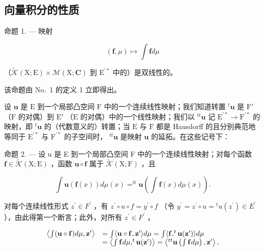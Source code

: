 \subsection{向量积分的性质}

命题 1. --- 映射

\[
(\mathbf {f}, \mu) \mapsto \int \mathbf {f} d \mu
\]

（\(\widetilde{\mathcal{K}} (\mathrm{X};\mathrm{E})\times \mathcal{M}(\mathrm{X};\mathbf{C})\) 到 \(\mathrm{E}^{\prime *}\) 中的）是双线性的。

该命题由 No.~1 的定义 1 立即得出。

设 \(\mathbf{u}\) 是 \(\mathrm{E}\) 到一个局部凸空间 \(\mathrm{F}\) 中的一个连续线性映射；我们知道转置 \(^t\mathbf{u}\) 是 \(\mathrm{F}'\) （\(\mathrm{F}\) 的对偶）到 \(\mathrm{E}'\) （\(\mathrm{E}\) 的对偶）中的一个线性映射；我们以 \(^{tt}\mathbf{u}\) 记 \(\mathrm{E}^{\prime *} \to \mathrm{F}^{\prime *}\) 的映射，即 \(^t\mathbf{u}\) 的（代数意义的）转置；当 \(\mathrm{E}\) 与 \(\mathrm{F}\) 都是 Hausdorff 的且分别典范地等同于 \(\mathrm{E}^{\prime *}\) 与 \(\mathrm{F}^{\prime *}\) 的子空间时， \(^{tt}\mathbf{u}\) 是映射 \(\mathbf{u}\) 的延拓。在这些记号下：

命题 2. --- 设 u 是 E 到一个局部凸空间 F 中的一个连续线性映射；对每个函数 \(\mathbf{f} \in \widetilde{\mathcal{K}}(\mathrm{X};\mathrm{E})\) ，函数 \(\mathbf{u} \circ \mathbf{f}\) 属于 \(\widetilde{\mathcal{K}}(\mathrm{X};\mathrm{F})\) ，且

\[
\int \mathbf {u} (\mathbf {f} (x)) d \mu (x) = ^ {t t} \mathbf {u} \left(\int \mathbf {f} (x) d \mu (x)\right).\tag{2}
\]

对每个连续线性形式 \(z^{\prime} \in F^{\prime}\) ，有 \(z^{\prime} \circ u \circ f = y^{\prime} \circ f\) （令 \(y^{\prime} = z^{\prime} \circ u = {}^{t}u(z^{\prime}) \in E^{\prime}\) ），由此得第一个断言；此外，对所有 \(z^{\prime} \in F^{\prime}\) ，

\[
\begin{array}{r l} \left\langle \int (\mathbf {u} \circ \mathbf {f}) d \mu , \mathbf {z} ^ {\prime} \right\rangle & = \int \langle \mathbf {u} \circ \mathbf {f}, \mathbf {z} ^ {\prime} \rangle d \mu = \int \langle \mathbf {f}, ^ {t} \mathbf {u} (\mathbf {z} ^ {\prime}) \rangle d \mu \\ & = \left\langle \int \mathbf {f} d \mu , ^ {t} \mathbf {u} (\mathbf {z} ^ {\prime}) \right\rangle = \left\langle {} ^ {t t} \mathbf {u} \left(\int \mathbf {f} d \mu\right), \mathbf {z} ^ {\prime} \right\rangle , \end{array}
\]

